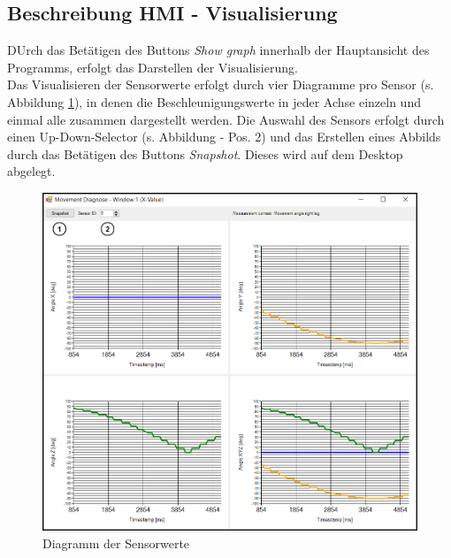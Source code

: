\subsection{Beschreibung HMI - Visualisierung}
\label{kap:ClientGraphProgrammVisu}
DUrch das Betätigen des Buttons \textit{Show graph} innerhalb der Hauptansicht des Programms, erfolgt das Darstellen der Visualisierung.\\
Das Visualisieren der Sensorwerte erfolgt durch vier Diagramme pro Sensor (s. Abbildung \ref{fig:clientgraphdiagramm}), in denen die Beschleunigungswerte in jeder Achse einzeln und einmal alle zusammen dargestellt werden. 
Die Auswahl des Sensors erfolgt durch einen Up-Down-Selector (s. Abbildung - Pos. 2) und das Erstellen eines Abbilds durch das Betätigen des Buttons \textit{Snapshot}. Dieses wird auf dem Desktop abgelegt.

\begin{figure}[H]
\centering
\includegraphics[width=1\linewidth]{Bilder/ClientGraphDiagramm}
\caption[Diagramm Sensorwerte]{Diagramm der Sensorwerte}
\label{fig:clientgraphdiagramm}
\end{figure}



